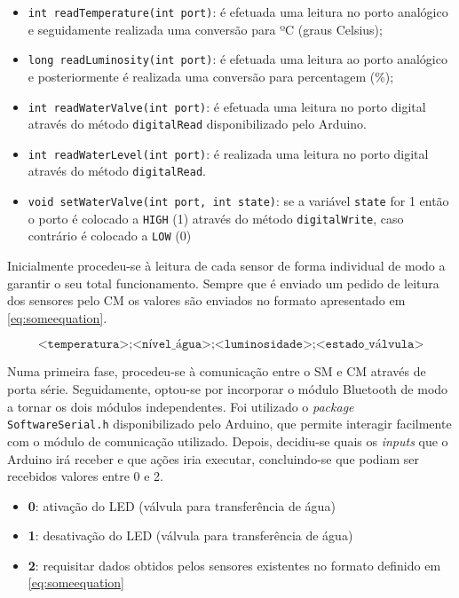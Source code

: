 \begin{itemize}
	\item \texttt{int readTemperature(int port)}: é efetuada uma leitura no porto analógico e seguidamente realizada uma conversão para ºC (graus Celsius);
	
	\item \texttt{long readLuminosity(int port)}: é efetuada uma leitura ao porto analógico e posteriormente é realizada uma conversão para percentagem (\%); 
	
	\item \texttt{int readWaterValve(int port)}: é efetuada uma leitura no porto digital através do método \texttt{digitalRead} disponibilizado pelo Arduino.
	
	\item \texttt{int readWaterLevel(int port)}: é realizada uma leitura no porto digital através do método \texttt{digitalRead}.
	
	
	\item \texttt{void setWaterValve(int port, int state)}: se a variável \texttt{state} for 1 então o porto é colocado a \texttt{HIGH} (1) através do método \texttt{digitalWrite}, caso contrário é colocado a \texttt{LOW} (0)
	
\end{itemize}

Inicialmente procedeu-se à leitura de cada sensor de forma individual de modo a garantir o seu total funcionamento. Sempre que é enviado um pedido de leitura dos sensores pelo \acl{CM} os valores são enviados no formato apresentado em \ref{eq:someequation}.

\begin{equation} 
\label{eq:someequation}
\texttt{<temperatura>;<nível\_água>;<luminosidade>;<estado\_válvula>}
\end{equation}



Numa primeira fase, procedeu-se à comunicação entre o \acl{SM} e \acl{CM} através de porta série. Seguidamente, optou-se por incorporar o módulo Bluetooth de modo a tornar os dois módulos independentes. Foi utilizado o  \textit{package} \texttt{SoftwareSerial.h} disponibilizado pelo Arduino, que permite interagir facilmente com o módulo de comunicação utilizado. Depois, decidiu-se quais os \textit{inputs} que o Arduino irá receber e que ações iria executar, concluindo-se que podiam ser recebidos valores entre 0 e 2. 


\begin{itemize}
	\item \textbf{0}: ativação do \ac{LED} (válvula para transferência de água)
	\item \textbf{1}: desativação do \ac{LED} (válvula para transferência de água)
	\item \textbf{2}: requisitar dados obtidos pelos sensores existentes no formato definido em \ref{eq:someequation}
\end{itemize}

